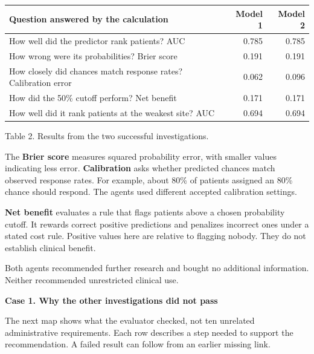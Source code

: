 \documentclass[10pt,a4paper]{article}
\newcommand{\reportcase}[2]{{\Large\bfseries Case #1. #2\par}\vspace{2mm}}
\newcommand{\reportcaption}[1]{\par{\small\color{Muted}#1\par}\vspace{1mm}}
\begin{document}
\begin{tabularx}{\textwidth}{@{}Yrr@{}}\toprule
Question answered by the calculation & Model 1 & Model 2 \\\midrule
How well did the predictor rank patients? AUC & 0.785 & 0.785 \\
How wrong were its probabilities? Brier score & 0.191 & 0.191 \\
How closely did chances match response rates? Calibration error & 0.062 & 0.096 \\
How did the 50\% cutoff perform? Net benefit & 0.171 & 0.171 \\
How well did it rank patients at the weakest site? AUC & 0.694 & 0.694 \\\bottomrule
\end{tabularx}
\reportcaption{Table 2. Results from the two successful investigations.}

The \textbf{Brier score} measures squared probability error, with smaller values indicating less error. \textbf{Calibration} asks whether predicted chances match observed response rates. For example, about 80\% of patients assigned an 80\% chance should respond. The agents used different accepted calibration settings.

\textbf{Net benefit} evaluates a rule that flags patients above a chosen probability cutoff. It rewards correct positive predictions and penalizes incorrect ones under a stated cost rule. Positive values here are relative to flagging nobody. They do not establish clinical benefit.

Both agents recommended further research and bought no additional information. Neither recommended unrestricted clinical use.

\newpage
\reportcase{1}{Why the other investigations did not pass}
The next map shows what the evaluator checked, not ten unrelated administrative requirements. Each row describes a step needed to support the recommendation. A failed result can follow from an earlier missing link.
\end{document}
